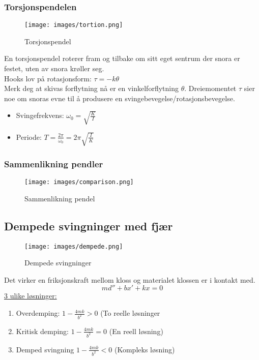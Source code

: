 \documentclass[12pt]{article}
\begin{document}
\subsubsection{Torsjonspendelen}
\begin{figure} [H]
    \centering
    \texttt{[image: images/tortion.png]}
    \caption{Torsjonspendel}
\end{figure}
En torsjonspendel roterer fram og tilbake om sitt eget sentrum der snora er festet, uten av snora krøller seg.\\
\bigskip
Hooks lov på rotasjonsform: $\tau = -k\theta$\\
\bigskip
Merk deg at skivas forflytning nå er en vinkelforflytning $\theta$. Dreiemomentet $\tau$ sier noe om snoras evne til å produsere en svingebevegelse/rotasjonsbevegelse.

\begin{itemize}
    \item[] Svingefrekvens: $\omega_0 = \sqrt{\frac{K}{I}}$
    \item[] Periode: $T = \frac{2\pi}{\omega_0} = 2\pi\sqrt{\frac{I}{K}}$
\end{itemize}


\subsubsection{Sammenlikning pendler}
\begin{figure} [H]
    \centering
    \texttt{[image: images/comparison.png]}
    \caption{Sammenlikning pendel}
\end{figure}

\subsection{Dempede svingninger med fjær}
\begin{figure} [H]
    \centering
    \texttt{[image: images/dempede.png]}
    \caption{Dempede svingninger}
\end{figure}
Det virker en friksjonskraft mellom kloss og materialet klossen er i kontakt med.
$$md''+bx'+kx=0$$
\underline{3 ulike løsninger:}
\begin{enumerate}
    \item Overdemping: $1-\frac{4mk}{b^2} > 0$ (To reelle løsninger
    \item Kritisk demping: $1-\frac{4mk}{b^2} = 0$ (En reell løsning)
    \item Demped svingning $1-\frac{4mk}{b^2} < 0$ (Kompleks løsning)
\end{enumerate}
\end{document}
